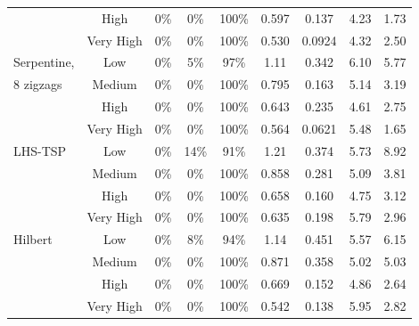 \documentclass[review]{elsarticle}
\begin{document}
\begin{table}[h!]
\begin{tabular}{|l|c|c|c|c|cc|cc|}
&             High & 0\% & 0\% & 100\% & 0.597 & 0.137  & 4.23 & 1.73 \\
&        Very High & 0\% & 0\% & 100\% & 0.530 & 0.0924 & 4.32 & 2.50 \\
Serpentine, &  Low & 0\% & 5\% &  97\% & 1.11  & 0.342  & 6.10 & 5.77 \\
8 zigzags & Medium & 0\% & 0\% & 100\% & 0.795 & 0.163  & 5.14 & 3.19 \\
&             High & 0\% & 0\% & 100\% & 0.643 & 0.235  & 4.61 & 2.75 \\
&        Very High & 0\% & 0\% & 100\% & 0.564 & 0.0621 & 5.48 & 1.65 \\
\hline
LHS-TSP & Low & 0\% & 14\% &  91\% & 1.21  & 0.374 & 5.73 & 8.92 \\
&      Medium & 0\% &  0\% & 100\% & 0.858 & 0.281 & 5.09 & 3.81 \\
&        High & 0\% &  0\% & 100\% & 0.658 & 0.160 & 4.75 & 3.12 \\
&   Very High & 0\% &  0\% & 100\% & 0.635 & 0.198 & 5.79 & 2.96 \\
\hline
Hilbert & Low & 0\% & 8\% &  94\% & 1.14  & 0.451 & 5.57 & 6.15 \\
&      Medium & 0\% & 0\% & 100\% & 0.871 & 0.358 & 5.02 & 5.03 \\
&        High & 0\% & 0\% & 100\% & 0.669 & 0.152 & 4.86 & 2.64 \\
&   Very High & 0\% & 0\% & 100\% & 0.542 & 0.138 & 5.95 & 2.82 \\
\hline
\end{tabular}
\end{table}





\end{document}
